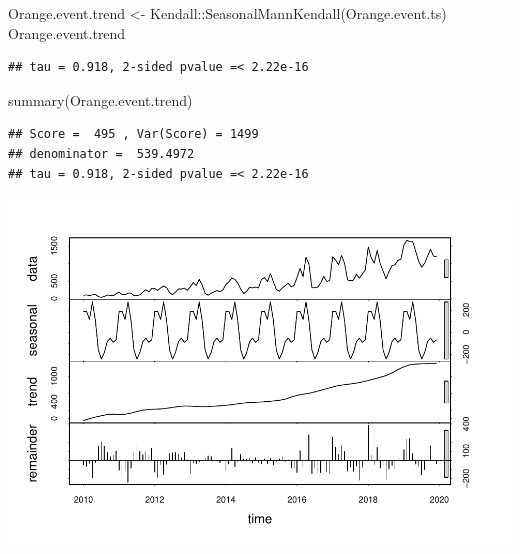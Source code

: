 \documentclass[
  12pt,
]{article}
\newenvironment{Shaded}{\begin{snugshade}}{\end{snugshade}}
\newcommand{\AttributeTok}[1]{\textcolor[rgb]{0.77,0.63,0.00}{#1}}
\newcommand{\CommentTok}[1]{\textcolor[rgb]{0.56,0.35,0.01}{\textit{#1}}}
\newcommand{\DecValTok}[1]{\textcolor[rgb]{0.00,0.00,0.81}{#1}}
\newcommand{\FunctionTok}[1]{\textcolor[rgb]{0.00,0.00,0.00}{#1}}
\newcommand{\NormalTok}[1]{#1}
\newcommand{\OtherTok}[1]{\textcolor[rgb]{0.56,0.35,0.01}{#1}}
\newcommand{\SpecialCharTok}[1]{\textcolor[rgb]{0.00,0.00,0.00}{#1}}
\newcommand{\StringTok}[1]{\textcolor[rgb]{0.31,0.60,0.02}{#1}}
\begin{document}
\begin{Shaded}
\begin{Highlighting}[]
\NormalTok{Orange.event.trend }\OtherTok{\textless{}{-}}\NormalTok{ Kendall}\SpecialCharTok{::}\FunctionTok{SeasonalMannKendall}\NormalTok{(Orange.event.ts) }
\NormalTok{Orange.event.trend}
\end{Highlighting}
\end{Shaded}

\begin{verbatim}
## tau = 0.918, 2-sided pvalue =< 2.22e-16
\end{verbatim}

\begin{Shaded}
\begin{Highlighting}[]
\FunctionTok{summary}\NormalTok{(Orange.event.trend)}
\end{Highlighting}
\end{Shaded}

\begin{verbatim}
## Score =  495 , Var(Score) = 1499
## denominator =  539.4972
## tau = 0.918, 2-sided pvalue =< 2.22e-16
\end{verbatim}

\begin{Shaded}
\end{Shaded}

\includegraphics{Project_Template_files/figure-latex/Event TS Code-4.pdf}
\end{document}
